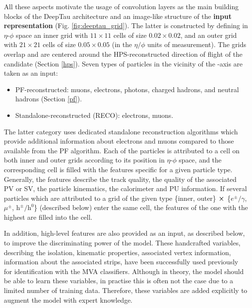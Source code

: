 All these aspects motivate the usage of convolution layers as the main building blocks of the DeepTau architecture and an image-like structure of the \tauh \textbf{input representation} (Fig. \ref{fig:deeptau_grid}). The latter is constructed by defining in $\eta$-$\phi$ space an inner grid with $11\times11$ cells of size $0.02\times0.02$, and an outer grid with $21\times21$ cells of size $0.05 \times 0.05$ (in the $\eta/\phi$ units of measurement). The grids overlap and are centered around the HPS-reconstructed direction of flight of the \tauh candidate (Section \ref{hps}). Seven types of particles in the vicinity of the \tauh-axis are taken as an input:

\begin{itemize}
    \item PF-reconstructed: muons, electrons, photons, charged hadrons, and neutral hadrons (Section \ref{pf}). 
    \item Standalone-reconstructed (RECO): electrons, muons.
\end{itemize}

The latter category uses dedicated standalone reconstruction algorithms which provide additional information about electrons and muons compared to those available from the PF algorithm. Each of the particles is attributed to a cell on both inner and outer grids according to its position in $\eta$-$\phi$ space, and the corresponding cell is filled with the features specific for a given particle type. Generally, the features describe the track quality, the quality of the associated PV or SV, the particle kinematics, the calorimeter and PU information. If several particles which are attributed to a grid of the given type \{inner, outer\} $\cross$ \{$e^\pm/\gamma$, $\mu^\pm$, $\text{h}^\pm/\text{h}^0$\} (described below) enter the same cell, the features of the one with the highest \pt are filled into the cell. 

In addition, high-level features are also provided as an input, as described below, to improve the discriminating power of the model. These handcrafted variables, describing the \tauh isolation, kinematic properties, associated vertex information, information about the associated strips, have been successfully used previously for \tauh identification with the MVA classifiers. Although in theory, the model should be able to learn these variables, in practise this is often not the case due to a limited number of training data. Therefore, these variables are added explicitly to augment the model with expert knowledge. 


